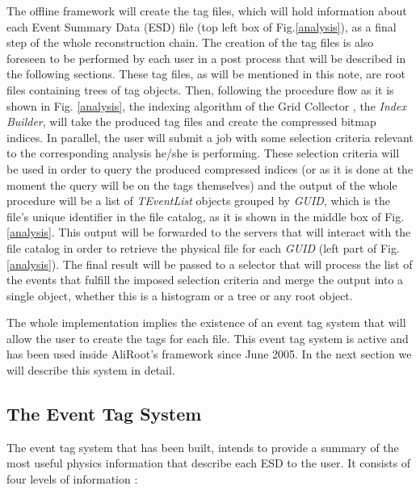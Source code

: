 \documentclass[12pt,a4paper,twoside]{article}
\begin{document}
{The offline framework will create the tag files, which will hold
information about each Event Summary Data (ESD) file (top left box of
Fig.\ref{analysis}), as a final step of the whole reconstruction
chain. The creation of the tag files is also foreseen to be performed
by each user in a post process that will be described in the following
sections. These tag files, as will be mentioned in this note, are root
files containing trees of tag objects. Then, following the procedure
flow as it is shown in Fig. \ref{analysis}, the indexing algorithm of
the Grid Collector \cite{GC1,GC2}, the \textit{Index Builder}, will
take the produced tag files and create the compressed bitmap
indices. In parallel, the user will submit a job with some selection
criteria relevant to the corresponding analysis he/she is
performing. These selection criteria will be used in order to query
the produced compressed indices (or as it is done at the moment the
query will be on the tags themselves) and the output of the whole
procedure will be a list of \textit{TEventList} objects grouped by
\textit{GUID}, which is the file's unique identifier in the file
catalog, as it is shown in the middle box of Fig.\ref{analysis}. This
output will be forwarded to the servers that will interact with the
file catalog in order to retrieve the physical file for each
\textit{GUID} (left part of Fig. \ref{analysis}). The final result
will be passed to a selector \cite{RootSelector} that will process the
list of the events that fulfill the imposed selection criteria and
merge the output into a single object, whether this is a histogram or
a tree or any root object. 

The whole implementation implies the existence of an event tag system
that will allow the user to create the tags for each file. This event
tag system is active and has been used inside AliRoot's framework
\cite{aliroot} since June 2005. In the next section we will describe
this system in detail. 


\subsection{The Event Tag System}

The event tag system that has been built, intends to provide a summary
of the most useful physics information that describe each ESD to the
user. It consists of four levels of information \cite{EventTagWeb}: 

\begin{itemize}


\end{itemize}}
\end{document}
